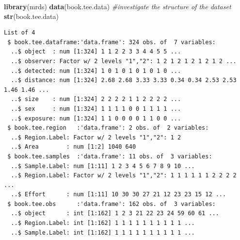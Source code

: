 \documentclass[]{book}
\newenvironment{Shaded}{\begin{snugshade}}{\end{snugshade}}
\newcommand{\KeywordTok}[1]{\textcolor[rgb]{0.13,0.29,0.53}{\textbf{#1}}}
\newcommand{\StringTok}[1]{\textcolor[rgb]{0.31,0.60,0.02}{#1}}
\newcommand{\CommentTok}[1]{\textcolor[rgb]{0.56,0.35,0.01}{\textit{#1}}}
\newcommand{\OperatorTok}[1]{\textcolor[rgb]{0.81,0.36,0.00}{\textbf{#1}}}
\newcommand{\NormalTok}[1]{#1}
\theoremstyle{definition}
\theoremstyle{definition}
\theoremstyle{remark}
\begin{document}
\begin{Shaded}
\begin{Highlighting}[]
\KeywordTok{library}\NormalTok{(mrds)}
\KeywordTok{data}\NormalTok{(book.tee.data)}
\CommentTok{#investigate the structure of the dataset}
\KeywordTok{str}\NormalTok{(book.tee.data)}
\end{Highlighting}
\end{Shaded}

\begin{verbatim}
List of 4
 $ book.tee.dataframe:'data.frame': 324 obs. of  7 variables:
  ..$ object  : num [1:324] 1 1 2 2 3 3 4 4 5 5 ...
  ..$ observer: Factor w/ 2 levels "1","2": 1 2 1 2 1 2 1 2 1 2 ...
  ..$ detected: num [1:324] 1 0 1 0 1 0 1 0 1 0 ...
  ..$ distance: num [1:324] 2.68 2.68 3.33 3.33 0.34 0.34 2.53 2.53 1.46 1.46 ...
  ..$ size    : num [1:324] 2 2 2 2 1 1 2 2 2 2 ...
  ..$ sex     : num [1:324] 1 1 1 1 0 0 1 1 1 1 ...
  ..$ exposure: num [1:324] 1 1 0 0 0 0 1 1 0 0 ...
 $ book.tee.region   :'data.frame': 2 obs. of  2 variables:
  ..$ Region.Label: Factor w/ 2 levels "1","2": 1 2
  ..$ Area        : num [1:2] 1040 640
 $ book.tee.samples  :'data.frame': 11 obs. of  3 variables:
  ..$ Sample.Label: num [1:11] 1 2 3 4 5 6 7 8 9 10 ...
  ..$ Region.Label: Factor w/ 2 levels "1","2": 1 1 1 1 1 1 2 2 2 2 ...
  ..$ Effort      : num [1:11] 10 30 30 27 21 12 23 23 15 12 ...
 $ book.tee.obs      :'data.frame': 162 obs. of  3 variables:
  ..$ object      : int [1:162] 1 2 3 21 22 23 24 59 60 61 ...
  ..$ Region.Label: int [1:162] 1 1 1 1 1 1 1 1 1 1 ...
  ..$ Sample.Label: int [1:162] 1 1 1 1 1 1 1 1 1 1 ...
\end{verbatim}

\begin{Shaded}
\end{Shaded}
\end{document}
